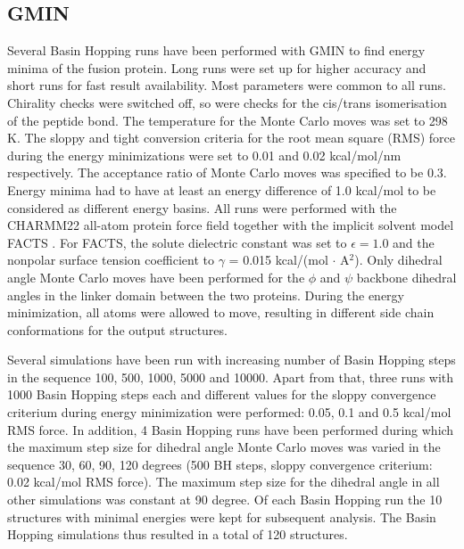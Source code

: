 \documentclass[english, a4paper, 12pt, titlepage, draft]{article}
\begin{document}
\subsection{GMIN}

Several Basin Hopping runs have been performed with GMIN to find energy minima of the fusion protein.
Long runs were set up for higher accuracy and short runs for fast result availability.
Most parameters were common to all runs.
Chirality checks were switched off, so were checks for the cis/trans isomerisation of the peptide bond.
The temperature for the Monte Carlo moves was set to 298 K.
The sloppy and tight conversion criteria for the root mean square (RMS) force during the energy minimizations were set to 0.01 and 0.02 kcal/mol/nm respectively.
The acceptance ratio of Monte Carlo moves was specified to be 0.3.
Energy minima had to have at least an energy difference of 1.0 kcal/mol to be considered as different energy basins.
All runs were performed with the CHARMM22 all-atom protein force field \cite{CHARMM22} together with the implicit solvent model FACTS \cite{FACTS}.
For FACTS, the solute dielectric constant was set to $\epsilon = 1.0$ and the nonpolar surface tension coefficient to $\gamma$ = 0.015 kcal/(mol $\cdot$ A$^2$).
Only dihedral angle Monte Carlo moves have been performed for the $\phi$ and $\psi$ backbone dihedral angles in the linker domain between the two proteins.
During the energy minimization, all atoms were allowed to move, resulting in different side chain conformations for the output structures.

Several simulations have been run with increasing number of Basin Hopping steps in the sequence 100, 500, 1000, 5000 and 10000.
Apart from that, three runs with 1000 Basin Hopping steps each and different values for the sloppy convergence criterium during energy minimization were performed: 0.05, 0.1 and 0.5 kcal/mol RMS force.
In addition, 4 Basin Hopping runs have been performed during which the maximum step size for dihedral angle Monte Carlo moves was varied in the sequence 30, 60, 90, 120 degrees (500 BH steps, sloppy convergence criterium: 0.02 kcal/mol RMS force).
The maximum step size for the dihedral angle in all other simulations was constant at 90 degree.
Of each Basin Hopping run the 10 structures with minimal energies were kept for subsequent analysis.
The Basin Hopping simulations thus resulted in a total of 120 structures.



\end{document}

